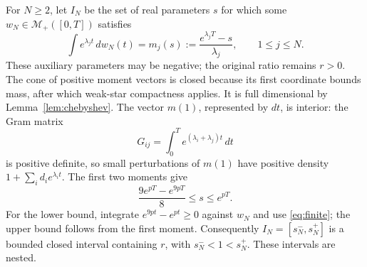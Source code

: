 \documentclass[11pt]{article}
\theoremstyle{remark}
\newcommand{\Mplus}{\mathcal M_+}
\begin{document}
For $N\ge2$, let $I_N$ be the set of real parameters $s$ for which some
$w_N\in\Mplus([0,T])$ satisfies
\begin{equation}\label{eq:finite}
 \int e^{\lambda_jt}\,dw_N(t)=m_j(s):=
           \frac{e^{\lambda_jT}-s}{\lambda_j},\qquad1\le j\le N.
\end{equation}
These auxiliary parameters may be negative; the original ratio remains
$r>0$. The cone of positive moment vectors is closed because its first
coordinate bounds mass, after which weak-star compactness applies. It is
full dimensional by Lemma~\ref{lem:chebyshev}. The vector $m(1)$, represented
by $dt$, is interior: the Gram matrix
\[
 G_{ij}=\int_0^T e^{(\lambda_i+\lambda_j)t}\,dt
\]
is positive definite, so small perturbations of $m(1)$ have positive density
$1+\sum_i d_i e^{\lambda_i t}$. The first two moments give
\begin{equation}\label{eq:ratiobounds}
 \frac{9e^{pT}-e^{9pT}}8\le s\le e^{pT}.
\end{equation}
For the lower bound, integrate $e^{9pt}-e^{pt}\ge0$ against $w_N$ and use
\eqref{eq:finite}; the upper bound follows from the first moment. Consequently
$I_N=[s_N^-,s_N^+]$ is a bounded closed interval containing $r$, with
$s_N^-<1<s_N^+$. These intervals are nested.
\end{document}
